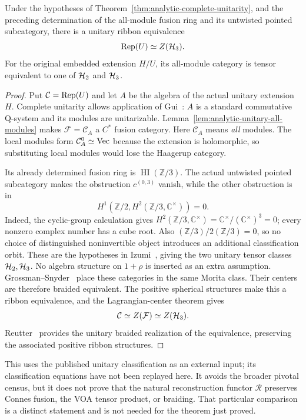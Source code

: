 \begin{theorem}
\label{thm:analytic-category}
Under the hypotheses of Theorem~\ref{thm:analytic-complete-unitarity},
and the preceding determination of the all-module fusion ring and its
untwisted pointed subcategory, there is a unitary ribbon equivalence
\[
 \Rep(U)\simeq Z(\HH_3).
\]
For the original embedded extension $H/U$, its all-module category is
tensor equivalent to one of $\HH_2$ and $\HH_3$.
\end{theorem}
\begin{proof}
Put $\mathcal C=\Rep(U)$ and let $A$ be the algebra of the actual
unitary extension $H$.  Complete unitarity allows application of
Gui~\cite[Theorems~2.21 and~2.28]{Gui}: $A$ is a standard commutative
Q-system and its modules are unitarizable.
Lemma~\ref{lem:analytic-unitary-all-modules} makes
$\mathcal F=\mathcal C_A$ a $C^*$ fusion category.  Here $\mathcal C_A$ means
\emph{all} modules.  The local modules form $\mathcal C_A^0\simeq\Vec$
because the extension is holomorphic, so substituting local modules
would lose the Haagerup category.

Its already determined fusion ring is
$\operatorname{HI}(\mathbb Z/3)$.  The actual untwisted pointed
subcategory makes the obstruction $c^{(0,3)}$ vanish, while the other
obstruction is in
\[
 H^1\!\left(\mathbb Z/2,H^2(\mathbb Z/3,\mathbb C^\times)\right)=0.
\]
Indeed, the cyclic-group calculation gives
$H^2(\mathbb Z/3,\mathbb C^\times)=
\mathbb C^\times/(\mathbb C^\times)^3=0$;
every nonzero complex number has a cube root.  Also
$(\mathbb Z/3)/2(\mathbb Z/3)=0$, so no choice of distinguished
noninvertible object introduces an additional classification orbit.
These are the hypotheses in
Izumi~\cite[Definition~2.7 and Theorems~5.9 and~9.1]{Izumi}, giving the two
unitary tensor classes $\HH_2,\HH_3$.  No algebra structure on
$1+\rho$ is inserted as an extra assumption.
Grossman--Snyder~\cite[Theorem~1.4]{GS} place these categories in the same
Morita class.  Their centers are therefore braided equivalent.
The positive spherical structures make this a ribbon equivalence, and
the Lagrangian-center theorem gives
\[
 \mathcal C\simeq Z(\mathcal F)\simeq Z(\HH_3).
\]
Reutter~\cite[Theorem~5]{Reutter} provides the unitary braided realization of the
equivalence, preserving the associated positive ribbon structures.
\end{proof}

This uses the published unitary classification as an external input;
its classification equations have not been replayed here.  It avoids
the broader pivotal census, but it does not prove that the natural
reconstruction functor $\mathcal R$ preserves Connes fusion, the VOA
tensor product, or braiding.  That particular comparison is a distinct
statement and is not needed for the theorem just proved.

